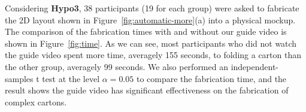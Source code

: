 Considering \textbf{Hypo3}, 38 participants (19 for each group) were asked to fabricate the 2D layout shown in Figure~\ref{fig:automatic-more}(a) into a physical mockup. 
The comparison of the fabrication times with and without our guide video is shown in Figure~\ref{fig:time}. 
As we can see, most participants who did not watch the guide video spent more time, averagely 155 seconds, to folding a carton than the other group, averagely 99 seconds.
% 
%
We also performed an independent-samples t test at the level $\alpha = 0.05$ to compare the fabrication time, and the result shows the guide video has significant effectiveness on the fabrication of complex cartons.




